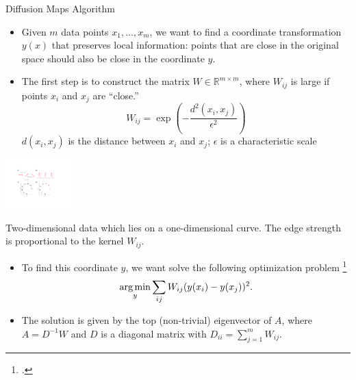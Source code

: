\documentclass[10pt,aspectratio=169]{beamer}
\begin{document}
\begin{frame}{Diffusion Maps Algorithm}

\begin{minipage}{0.7\textwidth}

\begin{itemize}

\item Given $m$ data points $x_1, \dots, x_m$, we want to find a coordinate transformation $y(x)$ that preserves local information: points that are close in the original space should also be close in the coordinate $y$.

\item The first step is to construct the matrix $W \in \mathbb{R}^{m \times m}$, where $W_{ij}$ is large if points $x_i$ and $x_j$ are ``close.''
$$W_{ij} = \exp \left( -\frac{d^2(x_i, x_j)}{\epsilon^2} \right)$$
$d(x_i, x_j)$ is the distance between $x_i$ and $x_j$;
$\epsilon$ is a characteristic scale

\end{itemize}
\end{minipage}
\begin{minipage}{0.28\textwidth}
\centering
\includegraphics[width=1in]{dmaps_edges}

{\scriptsize Two-dimensional data which lies on a one-dimensional curve. The edge strength is proportional to the kernel $W_{ij}$. \par}
\end{minipage}

\begin{itemize}
\item To find this coordinate $y$, we want solve the following optimization problem \footcite{Belkin2003}
$$\operatorname*{arg\,min}_{y} \sum_{ij} W_{ij} (y(x_i) - y(x_j))^2.$$
%
\item The solution is given by the top (non-trivial) eigenvector of $A$, where $A=D^{-1} W$ and $D$ is a diagonal matrix with $D_{ii} = \sum_{j=1}^{m} W_{ij}$.
%
%
\end{itemize}

\end{frame}
\end{document}
